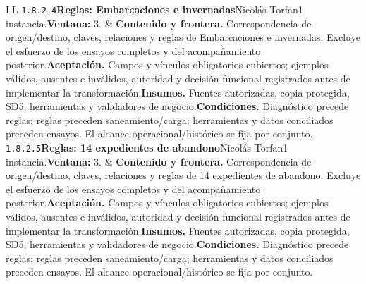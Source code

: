 \begin{longtable}{L{\tabcolsep\relax}L{\tabcolsep\relax}}
\texttt{1.\allowbreak{}8.\allowbreak{}2.\allowbreak{}4}\newline{}\textbf{Reglas: Embarcaciones e invernadas}\newline{}Nicolás Torfan\newline{}1 instancia.\newline{}\textbf{Ventana:} 3. & \textbf{Contenido y frontera.} Correspondencia de origen/destino, claves, relaciones y reglas de Embarcaciones e invernadas. Excluye el esfuerzo de los ensayos completos y del acompañamiento posterior.\newline{}\textbf{Aceptación.} Campos y vínculos obligatorios cubiertos; ejemplos válidos, ausentes e inválidos, autoridad y decisión funcional registrados antes de implementar la transformación.\newline{}\textbf{Insumos.} Fuentes autorizadas, copia protegida, SD5, herramientas y validadores de negocio.\newline{}\textbf{Condiciones.} Diagnóstico precede reglas; reglas preceden saneamiento/carga; herramientas y datos conciliados preceden ensayos. El alcance operacional/histórico se fija por conjunto.\\\hline
\texttt{1.\allowbreak{}8.\allowbreak{}2.\allowbreak{}5}\newline{}\textbf{Reglas: 14 expedientes de abandono}\newline{}Nicolás Torfan\newline{}1 instancia.\newline{}\textbf{Ventana:} 3. & \textbf{Contenido y frontera.} Correspondencia de origen/destino, claves, relaciones y reglas de 14 expedientes de abandono. Excluye el esfuerzo de los ensayos completos y del acompañamiento posterior.\newline{}\textbf{Aceptación.} Campos y vínculos obligatorios cubiertos; ejemplos válidos, ausentes e inválidos, autoridad y decisión funcional registrados antes de implementar la transformación.\newline{}\textbf{Insumos.} Fuentes autorizadas, copia protegida, SD5, herramientas y validadores de negocio.\newline{}\textbf{Condiciones.} Diagnóstico precede reglas; reglas preceden saneamiento/carga; herramientas y datos conciliados preceden ensayos. El alcance operacional/histórico se fija por conjunto.\\\hline

\end{longtable}
